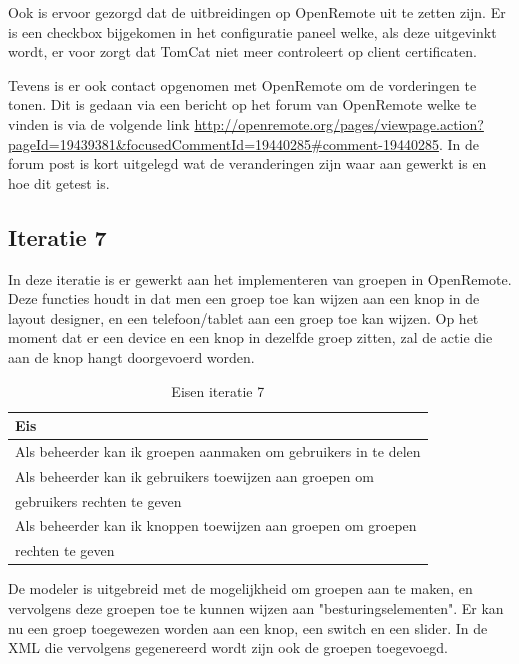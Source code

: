 \documentclass[]{article}
\begin{document}
Ook is ervoor gezorgd dat de uitbreidingen op OpenRemote uit te zetten
zijn. Er is een checkbox bijgekomen in het configuratie paneel welke, als
deze uitgevinkt wordt, er voor zorgt dat TomCat niet meer controleert op client
certificaten. 

Tevens is er ook contact opgenomen met OpenRemote om de vorderingen te tonen.
Dit is gedaan via een bericht op het forum van OpenRemote welke te vinden is via
de volgende link 
\url{http://openremote.org/pages/viewpage.action?pageId=19439381&focusedCommentId=19440285#comment-19440285}. 
In de forum post is kort uitgelegd wat de veranderingen zijn waar aan gewerkt is
en hoe dit getest is. 
 
\subsection{Iteratie 7}

In deze iteratie is er gewerkt aan het implementeren van groepen in OpenRemote.
Deze functies houdt in dat men een groep toe kan wijzen aan een knop in de layout
designer, en een telefoon/tablet aan een groep toe kan wijzen. Op het moment dat er
een device en een knop in dezelfde groep zitten, zal de actie die aan de knop
hangt doorgevoerd worden.

\begin{table}[htpb]
  \caption{Eisen iteratie 7}
  \begin{center}
    \begin{tabular}{|| l ||}\hline
        Eis                                                              \\\hline\hline
        Als beheerder kan ik groepen aanmaken om gebruikers in te delen  \\\hline
        Als beheerder kan ik gebruikers toewijzen aan groepen om         \\ 
        gebruikers rechten te geven                                      \\\hline
        Als beheerder kan ik knoppen toewijzen aan groepen om groepen    \\ 
        rechten te geven                                                 \\\hline
    \end{tabular}
  \end{center}
\end{table}

De modeler is uitgebreid met de mogelijkheid om groepen aan te maken, en
vervolgens deze groepen toe te kunnen wijzen aan "besturingselementen". Er kan
nu een groep toegewezen worden aan een knop, een switch en een slider. In de XML
die vervolgens gegenereerd wordt zijn ook de groepen toegevoegd. 
\end{document}
